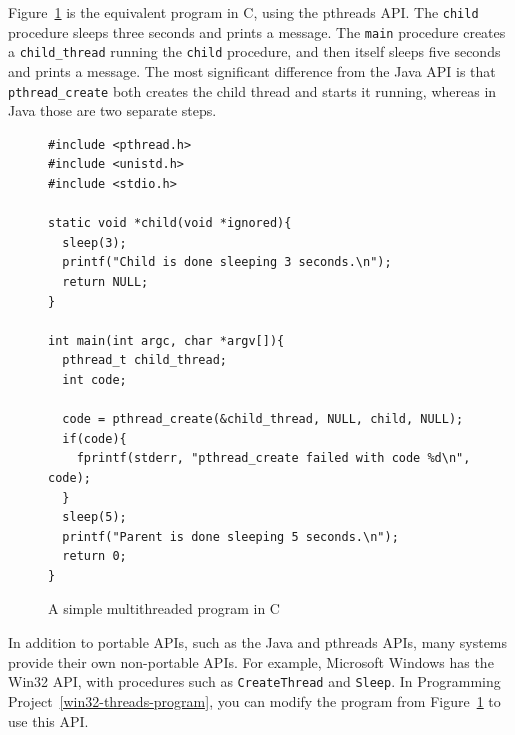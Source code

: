 Figure~\ref{simple2threads} is the equivalent program in C, using the
pthreads API.  The \verb|child| procedure sleeps three seconds and prints a
message.  The \verb|main| procedure creates a \verb|child_thread|
running the \verb|child| procedure, and then itself sleeps
five seconds and prints a message.  The most significant difference from the
Java API is that
\verb|pthread_create|
both creates the child thread and starts it running, whereas in Java
those are two separate steps.
\begin{figure}
\begin{verbatim}
#include <pthread.h>
#include <unistd.h>
#include <stdio.h>

static void *child(void *ignored){
  sleep(3);
  printf("Child is done sleeping 3 seconds.\n");
  return NULL;
}

int main(int argc, char *argv[]){
  pthread_t child_thread;
  int code;

  code = pthread_create(&child_thread, NULL, child, NULL);
  if(code){
    fprintf(stderr, "pthread_create failed with code %d\n", code);
  }
  sleep(5);
  printf("Parent is done sleeping 5 seconds.\n");
  return 0;
}
\end{verbatim}
\caption{A simple multithreaded program in C}
\label{simple2threads}
\end{figure}

In addition to portable APIs, such as the Java and pthreads APIs, many
systems provide their own non-portable APIs.  For example, Microsoft
Windows has the Win32 API, with procedures such as \verb|CreateThread|
and \verb|Sleep|.  In Programming Project~\ref{win32-threads-program}, you can modify the
program from Figure~\ref{simple2threads} to use this API.

